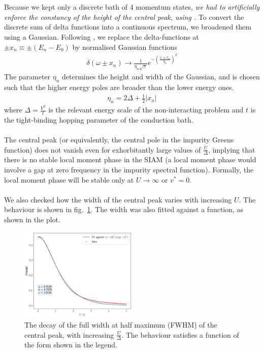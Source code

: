 \documentclass{article}
\numberwithin{equation}{section}
\begin{document}
\\\\
Because we kept only a discrete bath of 4 momentum states, \textit{we had to artificially enforce the constancy of the height of the central peak, using \cite{Langreth}.} To convert the discrete sum of delta functions into a continuous spectrum, we broadened them using a Gaussian. Following \cite{bulla_costi_nrg}, we replace the delta-functions at \(\pm x_n \equiv \pm(E_n - E_0)\) by normalised Gaussian functions
\begin{equation}\begin{aligned}
	\delta(\omega \pm x_n) \to \frac{1}{\eta_n\sqrt \pi}e^{-\left(\frac{\omega \pm x_n}{\eta_n}\right)^2}
\end{aligned}\end{equation}
The parameter \(\eta_n\) determines the height and width of the Gaussian, and is chosen such that the higher energy poles are broader than the lower energy ones.
\begin{equation}\begin{aligned}
	\eta_n = 2\Delta + \frac{1}{2}|x_n| 
\end{aligned}\end{equation}
where \(\Delta = \frac{V^2}{t}\) is the relevant energy scale of the non-interacting problem and \(t\) is the tight-binding hopping parameter of the conduction bath.
\\\\
The central peak (or equivalently, the central pole in the impurity Greens function) does not vanish even for exhorbitantly large values of \(\frac{U}{\Delta}\), implying that there is no stable local moment phase in the SIAM (a local moment phase would involve a gap at zero frequency in the impurity spectral function). Formally, the local moment phase will be stable only at \(U \to \infty\) or \(v^* = 0\).
\\\\
We also checked how the width of the central peak varies with increasing \(U\). The behaviour is shown in fig.~\ref{fwhm}. The width was also fitted against a function, as shown in the plot.
\begin{figure}[htpb!]
	\centering
	\includegraphics[width=0.5\textwidth]{./width_vs_U_simple_fit.pdf}
	\caption{The decay of the full width at half maximum (FWHM) of the central peak, with increasing \(\frac{U}{\Delta}\). The behaviour satisfies a function of the form shown in the legend.}
	\label{fwhm}
\end{figure}
\end{document}

